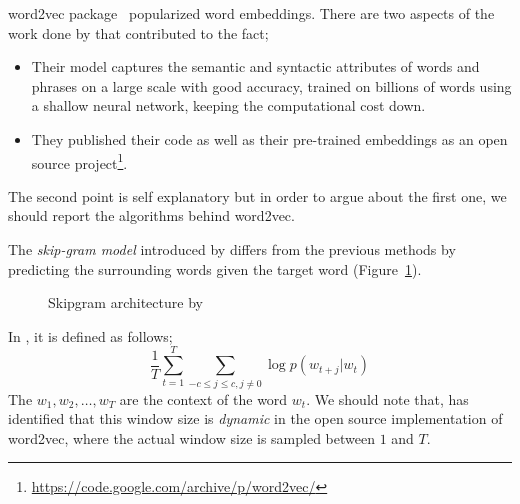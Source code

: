 word2vec package~\cite{mikolov_efficient_2013,mikolov_distributed_2013,mikolov_linguistic_2013} popularized word embeddings.
There are two aspects of the work done by \citeauthor{mikolov_distributed_2013}  that contributed to the fact;
\begin{itemize}
    \item Their model captures the semantic and syntactic attributes of words and phrases on a large scale with good accuracy, trained on billions of words using a shallow neural network, keeping the computational cost down.
    \item They published their code as well as their pre-trained embeddings as an open source project\footnote{\url{https://code.google.com/archive/p/word2vec/}}.
\end{itemize}
The second point is self explanatory but in order to argue about the first one, we should report the algorithms behind word2vec.

The \emph{skip-gram model} introduced by \textcite{mikolov_efficient_2013} differs from the previous methods by predicting the surrounding words given the target word (Figure~\ref{fig:skipgram}).

\begin{figure}[htbp]
    \centering
    \caption{Skipgram architecture by \textcite{mikolov_distributed_2013}}%
    \label{fig:skipgram}
\end{figure}

In , it is defined as follows;
\begin{equation}
    \frac{1}{T}\sum_{t=1}^{T}\sum_{-c \leq j \leq c, j \neq 0} \log p(w_{t+j}|w_t)
\end{equation}
The $w_{1}, w_{2}, \dots, w_{T}$ are the context of the word $w_t$.
We should note that, \textcite{levy_improving_2015} has identified that this window size is \emph{dynamic} in the open source implementation of word2vec, where the actual window size is sampled between $1$ and $T$.


